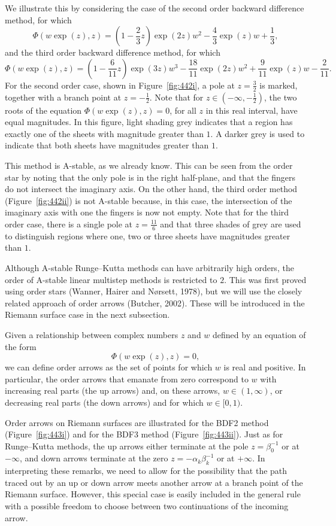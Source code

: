 \begin{theorem}
\begin{definition}
We illustrate this by considering the case of the second order backward difference method, for which
\[
\Phi(w \exp(z), z) = \left(1 - \frac{2}{3}z\right) \exp(2z) w^{2} - \frac{4}{3} \exp(z) w + \frac{1}{3},
\]
and the third order backward difference method, for which
\[
\Phi(w \exp(z), z) = \left(1 - \frac{6}{11}z\right) \exp(3z) w^{3} - \frac{18}{11} \exp(2z) w^{2} + \frac{9}{11} \exp(z) w - \frac{2}{11}.
\]
For the second order case, shown in Figure~\ref{fig:442i}, a pole at $z = \frac{3}{2}$ is marked, together with a branch point at $z = -\frac{1}{2}$. Note that for $z \in (-\infty, -\frac{1}{2})$, the two roots of the equation $\Phi(w \exp(z), z) = 0$, for all $z$ in this real interval, have equal magnitudes. In this figure, light shading grey indicates that a region has exactly one of the sheets with magnitude greater than $1$. A darker grey is used to indicate that both sheets have magnitudes greater than $1$.

This method is A-stable, as we already know. This can be seen from the order star by noting that the only pole is in the right half-plane, and that the fingers do not intersect the imaginary axis. On the other hand, the third order method (Figure~\ref{fig:442ii}) is not A-stable because, in this case, the intersection of the imaginary axis with one the fingers is now not empty. Note that for the third order case, there is a single pole at $z = \frac{11}{6}$ and that three shades of grey are used to distinguish regions where one, two or three sheets have magnitudes greater than $1$.

Although A-stable Runge--Kutta methods can have arbitrarily high orders, the order of A-stable linear multistep methods is restricted to $2$. This was first proved using order stars (Wanner, Hairer and Nørsett, 1978), but we will use the closely related approach of order arrows (Butcher, 2002). These will be introduced in the Riemann surface case in the next subsection.

Given a relationship between complex numbers $z$ and $w$ defined by an equation of the form
\[
\Phi(w \exp(z), z) = 0,
\]
we can define order arrows as the set of points for which $w$ is real and positive. In particular, the order arrows that emanate from zero correspond to $w$ with increasing real parts (the up arrows) and, on these arrows, $w \in (1, \infty)$, or decreasing real parts (the down arrows) and for which $w \in [0, 1)$.

Order arrows on Riemann surfaces are illustrated for the BDF2 method (Figure~\ref{fig:443i}) and for the BDF3 method (Figure~\ref{fig:443ii}). Just as for Runge--Kutta methods, the up arrows either terminate at the pole $z = \beta_0^{-1}$ or at $-\infty$, and down arrows terminate at the zero $z = -\alpha_k \beta_k^{-1}$ or at $+\infty$. In interpreting these remarks, we need to allow for the possibility that the path traced out by an up or down arrow meets another arrow at a branch point of the Riemann surface. However, this special case is easily included in the general rule with a possible freedom to choose between two continuations of the incoming arrow.


\end{definition}
\end{theorem}
